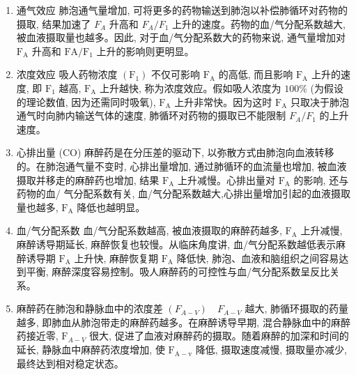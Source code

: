 \documentclass[10pt]{article}
\begin{document}
\begin{enumerate}
  \item 通气效应 肺泡通气量增加, 可将更多的药物输送到肺泡以补偿肺循环对药物的摄取, 结果加速了 $F_{A}$ 升高和 $F_{A} / F_{1}$ 上升的速度。药物的血/气分配系数越大, 被血液摄取量也越多。因此, 对于血/气分配系数大的药物来说, 通气量增加对 $\mathrm{F}_{\mathrm{A}}$ 升高和 $\mathrm{FA} / \mathrm{F}_{1}$ 上升的影响则更明显。

  \item 浓度效应 吸人药物浓度 $\left(\mathrm{F}_{1}\right)$ 不仅可影响 $\mathrm{F}_{\mathrm{A}}$ 的高低, 而且影响 $\mathrm{F}_{\mathrm{A}}$ 上升的速度, 即 $\mathrm{F}_{1}$ 越高, $\mathrm{F}_{\mathrm{A}}$ 上升越快, 称为浓度效应。假如吸人浓度为 $100 \%$ (为假设的理论数值, 因为还需同时吸氧), $\mathrm{F}_{\mathrm{A}}$ 上升非常快。因为这时 $\mathrm{F}_{\mathrm{A}}$ 只取决于肺泡通气时向肺内输送气体的速度, 肺循环对药物的摄取已不能限制 $F_{A} / F_{1}$ 的上升速度。

  \item 心排出量 (CO) 麻醉药是在分压差的驱动下, 以弥散方式由肺泡向血液转移的。在肺泡通气量不变时, 心排出量增加, 通过肺循环的血流量也增加, 被血液摄取并移走的麻醉药也增加, 结果 $\mathrm{F}_{\mathrm{A}}$ 上升减慢。心排出量对 $\mathrm{F}_{\mathrm{A}}$ 的影响, 还与药物的血/ 气分配系数有关, 血/气分配系数越大,心排出量增加引起的血液摄取量也越多, $\mathrm{F}_{\mathrm{A}}$ 降低也越明显。

  \item 血/气分配系数 血/气分配系数越高, 被血液摄取的麻醉药越多, $\mathrm{F}_{\mathrm{A}}$ 上升减慢, 麻醉诱导期延长, 麻醉恢复也较慢。从临床角度讲, 血/气分配系数越低表示麻醉诱导期 $\mathrm{F}_{\mathrm{A}}$ 上升快, 麻醉恢复期 $\mathrm{F}_{\mathrm{A}}$ 降低快, 肺泡、血液和脑组织之间容易达到平衡, 麻醉深度容易控制。吸人麻醉药的可控性与血/气分配系数呈反比关系。

  \item 麻醉药在肺泡和静脉血中的浓度差 $\left(F_{A-V}\right) \quad F_{A-V}$ 越大, 肺循环摄取的药量越多, 即肺血从肺泡带走的麻醉药越多。在麻醉诱导早期, 混合静脉血中的麻醉药接近零, $\mathrm{F}_{A-V}$ 很大, 促进了血液对麻醉药的摄取。随着麻醉的加深和时间的延长, 静脉血中麻醉药浓度增加, 使 $\mathrm{F}_{\mathrm{A}-\mathrm{v}}$ 降低, 摄取速度减慢, 摄取量亦减少, 最终达到相对稳定状态。

\end{enumerate}
\end{document}
